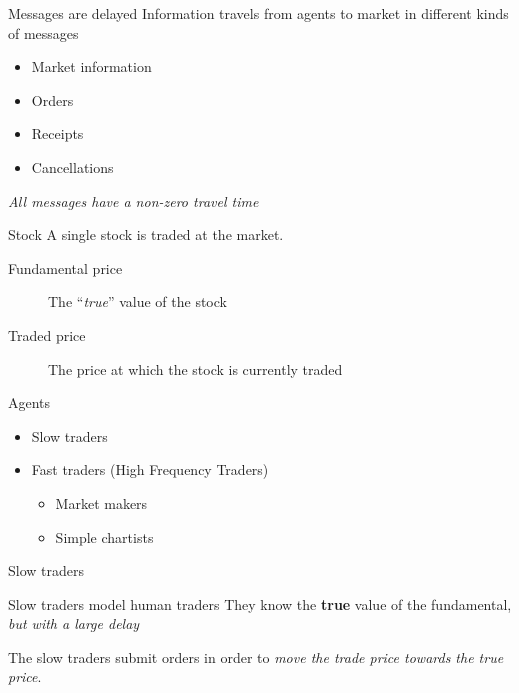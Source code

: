 \documentclass[14pt]{beamer}
\begin{document}
\begin{frame}{Messages are delayed}
Information travels from agents to market in different kinds of messages
\begin{itemize}
\item Market information
\item Orders
\item Receipts
\item Cancellations
\end{itemize}
\textit{All messages have a non-zero travel time}
\end{frame}

\begin{frame}{Stock}
A single stock is traded at the market.
\begin{description}
\item[Fundamental price] The ``\textit{true}'' value of the stock
\item[Traded price] The price at which the stock is currently traded
\end{description}
\end{frame}


\begin{frame}{Agents}
\begin{itemize}
\item Slow traders
\vspace{0.1in}
\item Fast traders (High Frequency Traders)
\begin{itemize}
\item Market makers
\item Simple chartists
\end{itemize}
\end{itemize}
\end{frame}



\begin{frame}{Slow traders}
\begin{block}{Slow traders model human traders}
They know the \textbf{true} value of the fundamental, \textit{but with a large delay}
\end{block}
\vspace{0.1in}
The slow traders submit orders in order to \textit{move the trade price towards the true price}.
\end{frame}


\end{document}

